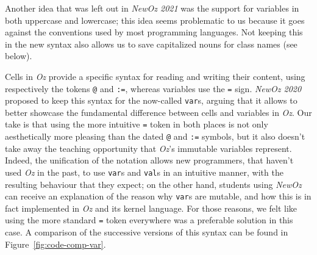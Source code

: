 Another idea that was left out in \textit{NewOz 2021} was the support for variables in both uppercase and lowercase;
this idea seems problematic to us because it goes against the conventions used by most programming languages.
Not keeping this in the new syntax also allows us to save capitalized nouns for class names (see below).\newline

Cells in \textit{Oz} provide a specific syntax for reading and writing their content, using respectively the tokens \texttt{@} and \texttt{:=}, whereas variables use the \texttt{=} sign.
\textit{NewOz 2020} proposed to keep this syntax for the now-called \texttt{var}s, arguing that it allows to better showcase the fundamental difference between cells and variables in \textit{Oz}.
Our take is that using the more intuitive \texttt{=} token in both places is not only aesthetically more pleasing than the dated \texttt{@} and \texttt{:=} symbols, but it also doesn't take away the teaching opportunity that \textit{Oz}'s immutable variables represent.
Indeed, the unification of the notation allows new programmers, that haven't used \textit{Oz} in the past, to use \texttt{var}s and \texttt{val}s in an intuitive manner, with the resulting behaviour that they expect;
on the other hand, students using \textit{NewOz} can receive an explanation of the reason why \texttt{var}s are mutable, and how this is in fact implemented in \textit{Oz} and its kernel language.
For those reasons, we felt like using the more standard \texttt{=} token everywhere was a preferable solution in this case.\newline
A comparison of the successive versions of this syntax can be found in Figure~\ref{fig:code-comp-var}.
